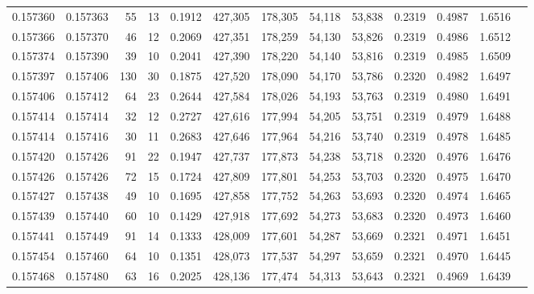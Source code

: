 \begin{tabular}{rrrrrrrrrrrrr}
0.157360 & 0.157363 &    55 &  13 &                                     0.1912 & 427,305 & 178,305 &  54,118 &  53,838 & 0.2319 & 0.4987 & 1.6516 \\
0.157366 & 0.157370 &    46 &  12 &                                     0.2069 & 427,351 & 178,259 &  54,130 &  53,826 & 0.2319 & 0.4986 & 1.6512 \\
0.157374 & 0.157390 &    39 &  10 &                                     0.2041 & 427,390 & 178,220 &  54,140 &  53,816 & 0.2319 & 0.4985 & 1.6509 \\
0.157397 & 0.157406 &   130 &  30 &                                     0.1875 & 427,520 & 178,090 &  54,170 &  53,786 & 0.2320 & 0.4982 & 1.6497 \\
0.157406 & 0.157412 &    64 &  23 &                                     0.2644 & 427,584 & 178,026 &  54,193 &  53,763 & 0.2319 & 0.4980 & 1.6491 \\
0.157414 & 0.157414 &    32 &  12 &                                     0.2727 & 427,616 & 177,994 &  54,205 &  53,751 & 0.2319 & 0.4979 & 1.6488 \\
0.157414 & 0.157416 &    30 &  11 &                                     0.2683 & 427,646 & 177,964 &  54,216 &  53,740 & 0.2319 & 0.4978 & 1.6485 \\
0.157420 & 0.157426 &    91 &  22 &                                     0.1947 & 427,737 & 177,873 &  54,238 &  53,718 & 0.2320 & 0.4976 & 1.6476 \\
0.157426 & 0.157426 &    72 &  15 &                                     0.1724 & 427,809 & 177,801 &  54,253 &  53,703 & 0.2320 & 0.4975 & 1.6470 \\
0.157427 & 0.157438 &    49 &  10 &                                     0.1695 & 427,858 & 177,752 &  54,263 &  53,693 & 0.2320 & 0.4974 & 1.6465 \\
0.157439 & 0.157440 &    60 &  10 &                                     0.1429 & 427,918 & 177,692 &  54,273 &  53,683 & 0.2320 & 0.4973 & 1.6460 \\
0.157441 & 0.157449 &    91 &  14 &                                     0.1333 & 428,009 & 177,601 &  54,287 &  53,669 & 0.2321 & 0.4971 & 1.6451 \\
0.157454 & 0.157460 &    64 &  10 &                                     0.1351 & 428,073 & 177,537 &  54,297 &  53,659 & 0.2321 & 0.4970 & 1.6445 \\
0.157468 & 0.157480 &    63 &  16 &                                     0.2025 & 428,136 & 177,474 &  54,313 &  53,643 & 0.2321 & 0.4969 & 1.6439 \\

\end{tabular}
